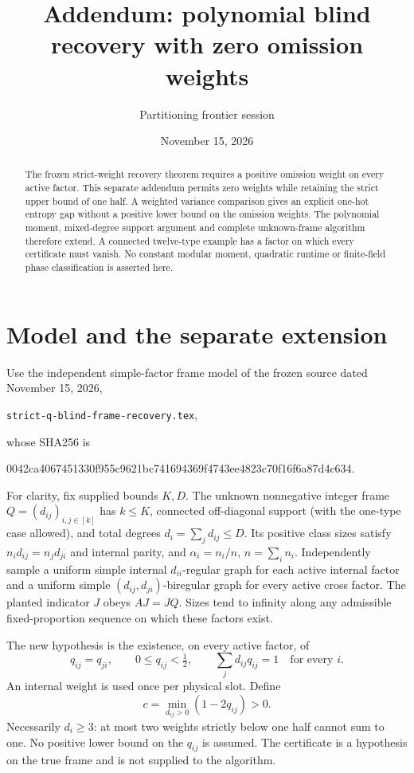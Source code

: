 \documentclass[11pt]{article}
\title{Addendum: polynomial blind recovery with zero omission weights}
\author{Partitioning frontier session}
\date{November 15, 2026}
\begin{document}
\maketitle
\begin{abstract}
The frozen strict-weight recovery theorem requires a positive omission
weight on every active factor. This separate addendum permits zero
weights while retaining the strict upper bound of one half. A weighted
variance comparison gives an explicit one-hot entropy gap without a
positive lower bound on the omission weights. The polynomial moment,
mixed-degree support argument and complete unknown-frame algorithm
therefore extend. A connected twelve-type example has a factor on which
every certificate must vanish. No constant modular moment, quadratic
runtime or finite-field phase classification is asserted here.
\end{abstract}

\section{Model and the separate extension}
Use the independent simple-factor frame model of the frozen source
dated November 15, 2026,
\begin{center}\texttt{strict-q-blind-frame-recovery.tex},\end{center}
whose SHA256 is
\begin{center}\small\ttfamily
0042ca4067451330f955c9621bc741694369f4743ee4823c70f16f6a87d4c634.
\end{center}
For clarity, fix supplied bounds $K,D$. The unknown nonnegative integer
frame $Q=(d_{ij})_{i,j\in[k]}$ has $k\le K$, connected off-diagonal
support (with the one-type case allowed), and total degrees
$d_i=\sum_jd_{ij}\le D$. Its positive class sizes satisfy
$n_id_{ij}=n_jd_{ji}$ and internal parity, and $\alpha_i=n_i/n$,
$n=\sum_i n_i$. Independently sample a uniform simple internal
$d_{ii}$-regular graph for each active internal factor and a uniform
simple $(d_{ij},d_{ji})$-biregular graph for every active cross factor.
The planted indicator $J$ obeys $AJ=JQ$. Sizes tend to infinity along
any admissible fixed-proportion sequence on which these factors exist.

The new hypothesis is the existence, on every active factor, of
\begin{equation}\label{eq:certificate}
 q_{ij}=q_{ji},\qquad 0\le q_{ij}<\tfrac12,
 \qquad \sum_jd_{ij}q_{ij}=1\quad\text{for every }i.
\end{equation}
An internal weight is used once per physical slot. Define
\[
 c=\min_{d_{ij}>0}(1-2q_{ij})>0.
\]
Necessarily $d_i\ge3$: at most two weights strictly below one half
cannot sum to one. No positive lower bound on the $q_{ij}$ is assumed.
The certificate is a hypothesis on the true frame and is not supplied
to the algorithm.
\end{document}
